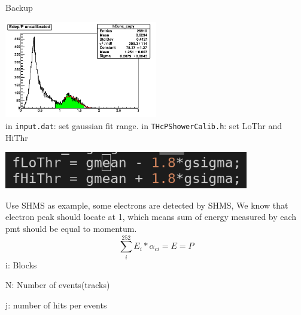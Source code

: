 \documentclass[aspectratio=169,xcolor=dvipsnames]{beamer}
\begin{document}
\begin{frame}{}
  \centering 
  Backup
\end{frame}

\begin{frame}{}
  \centering
  \includegraphics[width=0.5\textwidth]{eoverpuncalib.png}\\
  in \texttt{input.dat}: set gaussian fit range. in \texttt{THcPShowerCalib.h}: set LoThr and HiThr
  \begin{block}{}
    \centering \includegraphics[width=0.8\textwidth]{threshold.png}
    \label{fig:my_label}
  \end{block}
\end{frame}

\begin{frame}
Use SHMS as example, some electrons are detected by SHMS, We know that electron peak should locate at 1, which means sum of energy measured by each pmt should be equal to momentum. 
\begin{equation}
    \sum^{252}_i E_i*\alpha_{ci} = E = P
\end{equation}{}    
i: Blocks

N: Number of events(tracks)

j: number of hits per events
\end{frame}



\begin{frame}{}

\end{frame}{}
\end{document}

